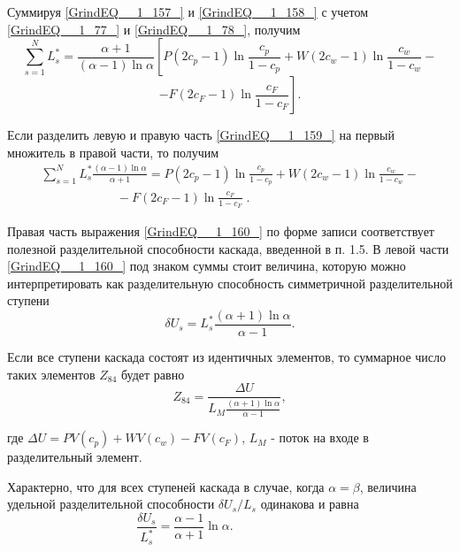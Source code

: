 Суммируя \ref{GrindEQ__1_157_} и \ref{GrindEQ__1_158_} с учетом \ref{GrindEQ__1_77_} и \ref{GrindEQ__1_78_}, получим
\[\sum _{s=1}^{N}L_{s}^{*}  =\frac{\alpha +1}{(\alpha -1)\ln \alpha } \left[P(2c_{p} -1)\ln \frac{c_{p} }{1-c_{p} } +W(2c_{w} -1)\ln \frac{c_{w} }{1-c_{w} } -\right. \] 
\begin{equation} \label{GrindEQ__1_159_} 
\left. -F(2c_{F} -1)\ln \frac{c_{F} }{1-c_{F} } \right].                                       
\end{equation} 

Если разделить левую и правую часть \ref{GrindEQ__1_159_} на первый множитель в правой части, то получим
\begin{equation} \label{GrindEQ__1_160_} 
\begin{array}{l} {\sum _{s=1}^{N}L_{s}^{*} \frac{(\alpha -1)\ln \alpha }{\alpha +1}  =P(2c_{p} -1)\ln \frac{c_{p} }{1-c_{p} } +W(2c_{w} -1)\ln \frac{c_{w} }{1-c_{w} } -} \\ {\; \; \; \; \; \; \; \; \; \; \; \; \; \; \; \; \; \; \; \; \; \; -F(2c_{F} -1)\ln \frac{c_{F} }{1-c_{F} } \mathrm{\; .}} \end{array} 
\end{equation} 

Правая часть выражения \ref{GrindEQ__1_160_} по форме записи соответствует полезной разделительной способности каскада, введенной в п. 1.5. В левой части \ref{GrindEQ__1_160_} под знаком суммы стоит величина, которую можно интерпретировать как разделительную способность симметричной разделительной ступени
\begin{equation} \label{GrindEQ__1_161_} 
\delta U_{s} =L_{s}^{*} \frac{(\alpha +1)\ln \alpha }{\alpha -1} .                              
\end{equation} 

Если все ступени каскада состоят из идентичных элементов, то суммарное число таких элементов $Z_{84} $ будет равно
\begin{equation} \label{GrindEQ__1_162_} 
Z_{84} =\frac{\Delta U}{L_{M} \frac{(\alpha +1)\ln \alpha }{\alpha -1} } ,                                
\end{equation} 

где  $\Delta U=PV(c_{p} )+WV(c_{w} )-FV(c_{F} )$, $L_{M} $ - поток на входе в  разделительный элемент.

 Характерно, что для всех ступеней каскада в случае, когда $\alpha =\beta $, величина удельной разделительной способности $\delta U_{s} /L_{s} $ одинакова и равна
\begin{equation} \label{GrindEQ__1_163_} 
\frac{\delta U_{s} }{L_{s}^{*} } =\frac{\alpha -1}{\alpha +1} \ln \alpha .     ~~~~~~~~~~~~~~~~~~~~~~~~~~~~~~~~~ 
\end{equation} 

